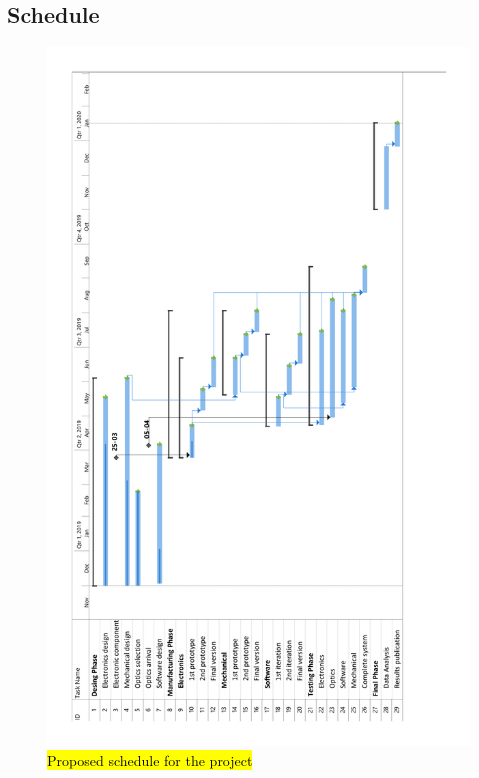 \begin{landscape}

\subsection{Schedule}
\begin{figure}[H]

\includegraphics[scale=0.65,angle=270]{3-project-planning/img/Gantt1.pdf}
\caption{\hl{Proposed schedule for the project}}
\label{GanttChart}
\end{figure}

\end{landscape}
